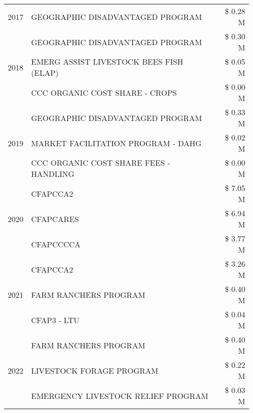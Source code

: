 \begin{tabular}{llr}
\cline{1-3}
2017 & GEOGRAPHIC DISADVANTAGED PROGRAM & \$ 0.28 M \\
\cline{1-3}
\multirow[t]{3}{*}{2018} & GEOGRAPHIC DISADVANTAGED PROGRAM & \$ 0.30 M \\
 & EMERG ASSIST LIVESTOCK BEES FISH (ELAP) & \$ 0.05 M \\
 & CCC ORGANIC COST SHARE - CROPS & \$ 0.00 M \\
\cline{1-3}
\multirow[t]{3}{*}{2019} & GEOGRAPHIC DISADVANTAGED PROGRAM & \$ 0.33 M \\
 & MARKET FACILITATION PROGRAM - DAHG & \$ 0.02 M \\
 & CCC ORGANIC COST SHARE FEES - HANDLING & \$ 0.00 M \\
\cline{1-3}
\multirow[t]{3}{*}{2020} & CFAPCCA2 & \$ 7.05 M \\
 & CFAPCARES & \$ 6.94 M \\
 & CFAPCCCCA & \$ 3.77 M \\
\cline{1-3}
\multirow[t]{3}{*}{2021} & CFAPCCA2 & \$ 3.26 M \\
 & FARM RANCHERS PROGRAM & \$ 0.40 M \\
 & CFAP3 - LTU & \$ 0.04 M \\
\cline{1-3}
\multirow[t]{3}{*}{2022} & FARM RANCHERS PROGRAM & \$ 0.40 M \\
 & LIVESTOCK FORAGE PROGRAM & \$ 0.22 M \\
 & EMERGENCY LIVESTOCK RELIEF PROGRAM & \$ 0.03 M \\
\cline{1-3}
\bottomrule
\end{tabular}
